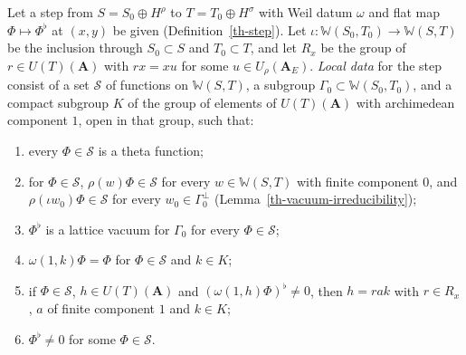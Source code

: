 \begin{definition}\label{th-step-local}
Let a step from $S=S_0\oplus H^\rho$ to $T=T_0\oplus H^\sigma$ with Weil datum
$\omega$ and flat map $\Phi\mapsto\Phi^\flat$ at $(x,y)$ be given
(Definition~\ref{th-step}). Let $\iota\colon\mathbb W(S_0,T_0)\to\mathbb W(S,T)$
be the inclusion through $S_0\subset S$ and $T_0\subset T$, and let $R_x$ be the
group of $r\in U(T)(\mathbf A)$ with $rx=xu$ for some $u\in U_\rho(\mathbf A_E)$.
\emph{Local data} for the step consist of a set $\mathcal S$ of functions on
$\mathbb W(S,T)$, a subgroup $\Gamma_0\subset\mathbb W(S_0,T_0)$, and a
compact subgroup $K$ of the group of elements of $U(T)(\mathbf A)$ with
archimedean component $1$, open in that group, such that:
\begin{enumerate}
\item every $\Phi\in\mathcal S$ is a theta function;
\item for $\Phi\in\mathcal S$, $\rho(w)\Phi\in\mathcal S$ for every
  $w\in\mathbb W(S,T)$ with finite component $0$, and
  $\rho(\iota w_0)\Phi\in\mathcal S$ for every $w_0\in\Gamma_0^\perp$
  (Lemma~\ref{th-vacuum-irreducibility});
\item $\Phi^\flat$ is a lattice vacuum for $\Gamma_0$ for every $\Phi\in\mathcal S$;
\item $\omega(1,k)\Phi=\Phi$ for $\Phi\in\mathcal S$ and $k\in K$;
\item if $\Phi\in\mathcal S$, $h\in U(T)(\mathbf A)$ and
  $(\omega(1,h)\Phi)^\flat\neq0$, then $h=rak$ with $r\in R_x$, $a$ of finite
  component $1$ and $k\in K$;
\item $\Phi^\flat\neq0$ for some $\Phi\in\mathcal S$.
\end{enumerate}
\end{definition}

